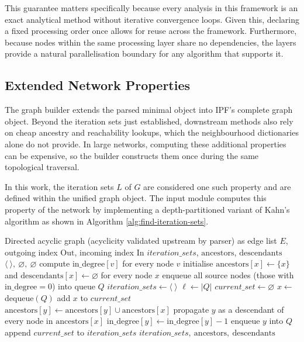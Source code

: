 \documentclass[12pt]{report}
\begin{document}
This guarantee matters specifically because every analysis in this framework is an exact analytical method without iterative convergence loops. Given this, declaring a fixed processing order once allows for reuse across the framework. Furthermore, because nodes within the same processing layer share no dependencies, the layers provide a natural parallelisation boundary for any algorithm that supports it.  

\subsection{Extended Network Properties}
The graph builder extends the parsed minimal object into IPF's complete graph object. Beyond the iteration sets just established, downstream methods also rely on cheap ancestry and reachability lookups, which the neighbourhood dictionaries alone do not provide. In large networks, computing these additional properties can be expensive, so the builder constructs them once during the same topological traversal.

In this work, the iteration sets $L$ of $G$ are considered one such property and are defined within the unified graph object. The input module computes this property of the network by implementing a depth-partitioned variant of Kahn's algorithm as shown in Algorithm \ref{alg:find-iteration-sets}. 

\begin{algorithm}[h]
\caption{FindIterationSetsWithClosure}
\label{alg:find-iteration-sets}
\begin{algorithmic}[1]
\Require Directed acyclic graph (acyclicity validated upstream by parser) as edge list $E$, outgoing index $\mathrm{Out}$, incoming index $\mathrm{In}$
\Ensure $\textit{iteration\_sets}$, $\mathrm{ancestors}$, $\mathrm{descendants}$
    \State \Return $\langle \ \rangle,\ \varnothing,\ \varnothing$
\EndIf
\State compute $\mathrm{in\_degree}[v]$ for every node $v$
\State initialise $\mathrm{ancestors}[x] \gets \{x\}$ and $\mathrm{descendants}[x] \gets \varnothing$ for every node $x$
\State enqueue all source nodes (those with $\mathrm{in\_degree} = 0$) into queue $Q$
\State $\textit{iteration\_sets} \gets \langle \ \rangle$
    \State $\ell \gets |Q|$ 
    \State $\textit{current\_set} \gets \varnothing$
        \State $x \gets$ dequeue$(Q)$
        \State add $x$ to $\textit{current\_set}$
            \State $\mathrm{ancestors}[y] \gets \mathrm{ancestors}[y] \cup \mathrm{ancestors}[x]$
            \State propagate $y$ as a descendant of every node in $\mathrm{ancestors}[x]$
            \State $\mathrm{in\_degree}[y] \gets \mathrm{in\_degree}[y] - 1$
                \State enqueue $y$ into $Q$
            \EndIf
        \EndFor
    \EndFor
    \State append $\textit{current\_set}$ to $\textit{iteration\_sets}$
\EndWhile
\State \Return $\textit{iteration\_sets},\ \mathrm{ancestors},\ \mathrm{descendants}$
\end{algorithmic}
\end{algorithm}
\end{document}
